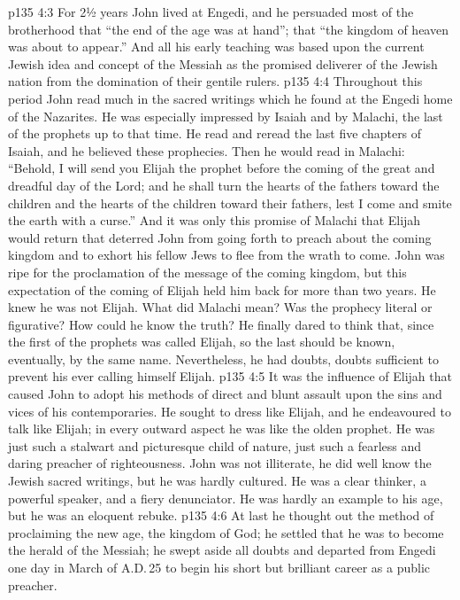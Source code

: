 \vs p135 4:3 For 2½ years John lived at Engedi, and he persuaded most of the brotherhood that “the end of the age was at hand”; that “the kingdom of heaven was about to appear.” And all his early teaching was based upon the current Jewish idea and concept of the Messiah as the promised deliverer of the Jewish nation from the domination of their gentile rulers.
\vs p135 4:4 Throughout this period John read much in the sacred writings which he found at the Engedi home of the Nazarites. He was especially impressed by Isaiah and by Malachi, the last of the prophets up to that time. He read and reread the last five chapters of Isaiah, and he believed these prophecies. Then he would read in Malachi: “Behold, I will send you Elijah the prophet before the coming of the great and dreadful day of the Lord; and he shall turn the hearts of the fathers toward the children and the hearts of the children toward their fathers, lest I come and smite the earth with a curse.” And it was only this promise of Malachi that Elijah would return that deterred John from going forth to preach about the coming kingdom and to exhort his fellow Jews to flee from the wrath to come. John was ripe for the proclamation of the message of the coming kingdom, but this expectation of the coming of Elijah held him back for more than two years. He knew he was not Elijah. What did Malachi mean? Was the prophecy literal or figurative? How could he know the truth? He finally dared to think that, since the first of the prophets was called Elijah, so the last should be known, eventually, by the same name. Nevertheless, he had doubts, doubts sufficient to prevent his ever calling himself Elijah.
\vs p135 4:5 It was the influence of Elijah that caused John to adopt his methods of direct and blunt assault upon the sins and vices of his contemporaries. He sought to dress like Elijah, and he endeavoured to talk like Elijah; in every outward aspect he was like the olden prophet. He was just such a stalwart and picturesque child of nature, just such a fearless and daring preacher of righteousness. John was not illiterate, he did well know the Jewish sacred writings, but he was hardly cultured. He was a clear thinker, a powerful speaker, and a fiery denunciator. He was hardly an example to his age, but he was an eloquent rebuke.
\vs p135 4:6 At last he thought out the method of proclaiming the new age, the kingdom of God; he settled that he was to become the herald of the Messiah; he swept aside all doubts and departed from Engedi one day in March of A.D.\,25 to begin his short but brilliant career as a public preacher.
